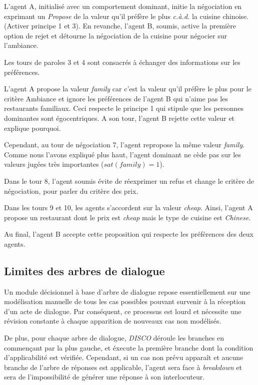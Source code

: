 	\par 
	L'agent A, initialisé avec un comportement dominant, initie la négociation en exprimant un \emph{Propose} de la valeur qu'il préfère le plus \textit{c.à.d.} la cuisine chinoise. (Activer principe 1 et 3). En revanche, l'agent B, soumis, active la première option de rejet et détourne la négociation de la cuisine pour négocier sur l'ambiance. 
	
	Les tours de paroles 3 et 4 sont consacrés à échanger des informations sur les préférences. 
	
	L'agent A propose la valeur \emph{family} car c'est la valeur qu'il préfère le plus pour le critère Ambiance et ignore les préférences de l'agent B qui n'aime pas les restaurants familiaux. Ceci respecte le principe 1 qui stipule que les personnes dominantes sont égocentriques. 
	A son tour, l'agent B rejette cette valeur et explique pourquoi. 
	
	Cependant, au tour de négociation 7, l'agent repropose la même valeur \emph{family}. Comme nous l'avons expliqué plus haut, l'agent dominant ne cède pas sur les valeurs jugées très importantes ($sat(family) =1$). 
	
	Dans le tour 8, l'agent soumis évite de réexprimer un refus et change le critère de négociation, pour parler du critère des prix.
	
	Dans les tours 9 et 10, les agents s'accordent sur la valeur \emph{cheap}. 
	Ainsi, l'agent A propose un restaurant dont le prix est \emph{cheap} mais le type de cuisine est \emph{Chinese}. 

	Au final, l'agent B accepte cette proposition qui respecte les préférences des deux agents.
	

	\subsection{Limites des arbres de dialogue}
		Un module décisionnel à base d'arbre de dialogue repose essentiellement sur une modélisation manuelle de tous les cas possibles pouvant survenir à la réception d'un acte de dialogue. Par conséquent, ce processus est lourd et nécessite une révision constante à chaque apparition de nouveaux cas non modélisés.
		
		De plus, pour chaque arbre de dialogue, \emph{DISCO} déroule les branches en commençant par la plus gauche, et éxecute la première branche dont la condition d'applicabilité est vérifiée. Cependant, si un cas non prévu apparaît et aucune branche de l'arbre de réponses est applicable, l'agent sera face à \textit{breakdown} et sera de l'impossibilité de générer une réponse à son interlocuteur. 
		
